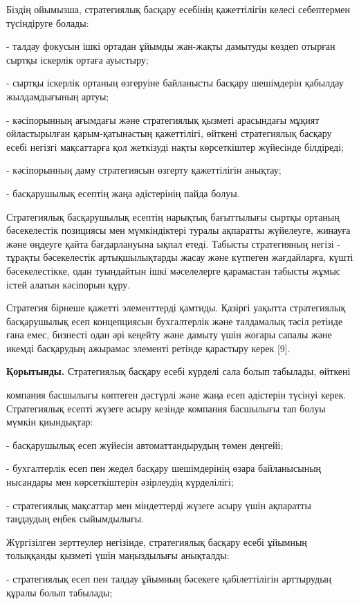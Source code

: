 \begin{multicols}{2}
Біздің ойымызша, стратегиялық басқару есебінің қажеттілігін келесі
себептермен түсіндіруге болады:

- талдау фокусын ішкі ортадан ұйымды жан-жақты дамытуды көздеп отырған
сыртқы іскерлік ортаға ауыстыру;

- сыртқы іскерлік ортаның өзгеруіне байланысты басқару шешімдерін
қабылдау жылдамдығының артуы;

- кәсіпорынның ағымдағы және стратегиялық қызметі арасындағы мұқият
ойластырылған қарым-қатынастың қажеттілігі, өйткені стратегиялық басқару
есебі негізгі мақсаттарға қол жеткізуді нақты көрсеткіштер жүйесінде
білдіреді;

- кәсіпорынның даму стратегиясын өзгерту қажеттілігін анықтау;

- басқарушылық есептің жаңа әдістерінің пайда болуы.

Стратегиялық басқарушылық есептің нарықтық бағыттылығы сыртқы ортаның
бәсекелестік позициясы мен мүмкіндіктері туралы ақпаратты жүйелеуге,
жинауға және өңдеуге қайта бағдарлануына ықпал етеді. Табысты
стратегияның негізі - тұрақты бәсекелестік артықшылықтарды жасау және
күтпеген жағдайларға, күшті бәсекелестікке, одан туындайтын ішкі
мәселелерге қарамастан табысты жұмыс істей алатын кәсіпорын құру.

Стратегия бірнеше қажетті элементтерді қамтиды. Қазіргі уақытта
стратегиялық басқарушылық есеп концепциясын бухгалтерлік және талдамалық
тәсіл ретінде ғана емес, бизнесті одан әрі кеңейту және дамыту үшін
жоғары сапалы және икемді басқарудың ажырамас элементі ретінде қарастыру
керек {[}9{]}.

{\bfseries Қорытынды.} Стратегиялық басқару есебі күрделі сала болып
табылады, өйткені

компания басшылығы көптеген дәстүрлі және жаңа есеп әдістерін түсінуі
керек. Стратегиялық есепті жүзеге асыру кезінде компания басшылығы тап
болуы мүмкін қиындықтар:

- басқарушылық есеп жүйесін автоматтандырудың төмен деңгейі;

- бухгалтерлік есеп пен жедел басқару шешімдерінің өзара байланысының
нысандары мен көрсеткіштерін әзірлеудің күрделілігі;

- стратегиялық мақсаттар мен міндеттерді жүзеге асыру үшін ақпаратты
таңдаудың еңбек сыйымдылығы.

Жүргізілген зерттеулер негізінде, стратегиялық басқару есебі ұйымның
толыққанды қызметі үшін маңыздылығы анықталды:

- стратегиялық есеп пен талдау ұйымның бәсекеге қабілеттілігін
арттырудың құралы болып табылады;


\end{multicols}
